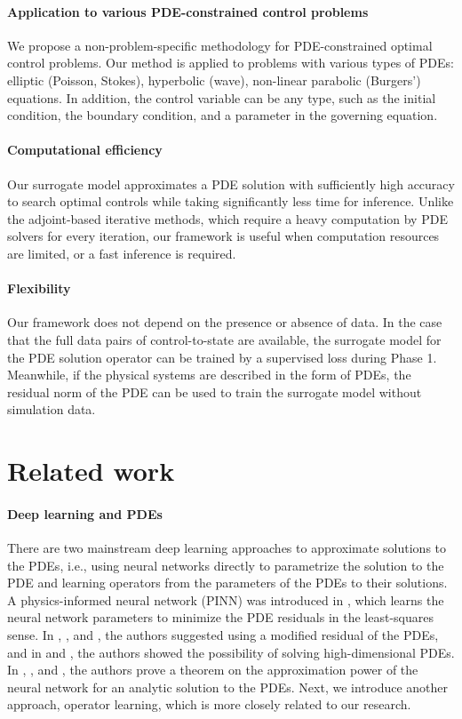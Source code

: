 \documentclass[letterpaper]{article}
\begin{document}
\paragraph{Application to various PDE-constrained control problems}We propose a non-problem-specific methodology for PDE-constrained optimal control problems. Our method is applied to problems with various types of PDEs: elliptic (Poisson, Stokes), hyperbolic (wave), non-linear parabolic (Burgers') equations. In addition, the control variable can be any type, such as the initial condition, the boundary condition, and a parameter in the governing equation.

\paragraph{Computational efficiency} Our surrogate model approximates a PDE solution with sufficiently high accuracy to search optimal controls while taking significantly less time for inference. Unlike the adjoint-based iterative methods, which require a heavy computation by PDE solvers for every iteration, our framework is useful when computation resources are limited, or a fast inference is required.

\paragraph{Flexibility} Our framework does not depend on the presence or absence of data. In the case that the full data pairs of control-to-state are available, the surrogate model for the PDE solution operator can be trained by a supervised loss during Phase 1. Meanwhile, if the physical systems are described in the form of PDEs, the residual norm of the PDE can be used to train the surrogate model without simulation data.



\section*{Related work}\label{realted}

\paragraph{Deep learning and PDEs}
There are two mainstream deep learning approaches to approximate solutions to the PDEs, i.e., using neural networks directly to parametrize the solution to the PDE and learning operators from the parameters of the PDEs to their solutions. A physics-informed neural network (PINN) was introduced in \cite{raissi2019physics}, which learns the neural network parameters to minimize the PDE residuals in the least-squares sense. In \cite{nabian2018deep}, \cite{son2021sobolev}, and \cite{weinan2018deep}, the authors suggested using a modified residual of the PDEs, and in \cite{han2018solving} and \cite{sirignano2018dgm}, the authors showed the possibility of solving high-dimensional PDEs. In \cite{hwang2020trend}, \cite{jo2020deep}, and \cite{sirignano2018dgm}, the authors prove a theorem on the approximation power of the neural network for an analytic solution to the PDEs. Next, we introduce another approach, operator learning, which is more closely related to our research.
\end{document}
